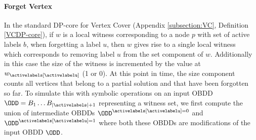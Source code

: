 
\paragraph*{Forget Vertex}

In the standard DP-core for {\sc Vertex Cover} (Appendix \ref{subsection:VC}, Definition \ref{VCDP-core}), if $w$ is a local witness corresponding to a node $p$ with set of active labels $b$, when forgetting a label $u$, then $w$ gives rise to a single local witness which corresponds to removing label $u$ from the set component of $w$. Additionally in this case the size of the witness is incremented by the value at $w_{\activelabels[\activelabelu]}$ (1 or 0). At this point in time, the size component counts all vertices that belong to a partial solution and that have been forgotten so far. To simulate this with symbolic operations on an input OBDD $\ODD = B_1\ldots B_{|\activelabels|+1}$ representing a witness set, we first compute the union of intermediate OBDDs $\ODD^{\activelabels[\activelabelu]=0} $ and $\ODD^{\activelabels[\activelabelu]=1}$ where both these OBDDs are modifications of the input OBDD $\ODD$.

